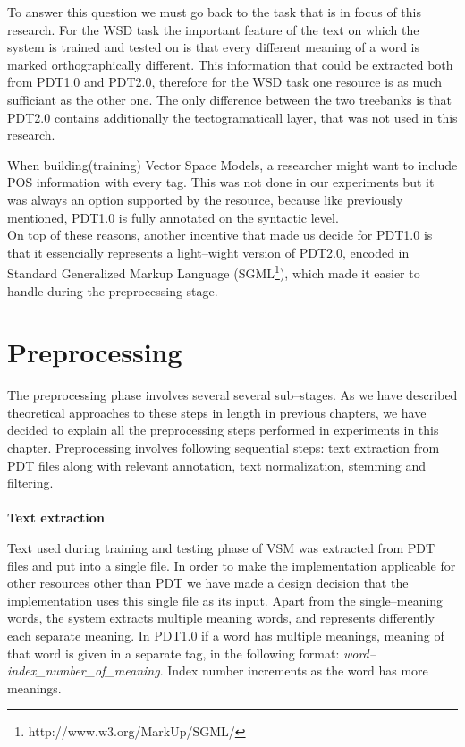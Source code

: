 To answer this question we must go back to the task that is in focus of this research. For the WSD task the 
important feature of the text on which the system is trained and tested on is that every different meaning of a 
word is marked orthographically different. This information that could be extracted both from PDT1.0 and 
PDT2.0, therefore for the WSD task one resource is as much sufficiant as the other one. The only 
difference between the two treebanks is that PDT2.0 contains additionally the tectogramaticall layer, that 
was not used in this research.  

When building(training) Vector Space Models, a researcher might want to include POS information with 
every tag. This was not done in our experiments but it was always an option supported by the resource, 
because like previously mentioned, PDT1.0 is fully annotated on the syntactic level. 
\\On top of these reasons, another incentive that made us decide for PDT1.0 is that it essencially 
represents a light--wight version of PDT2.0, encoded in Standard Generalized Markup Language 
(SGML\footnote{http://www.w3.org/MarkUp/SGML/}), which made it easier to handle during the 
preprocessing stage.

\section{Preprocessing}
The preprocessing phase involves several several sub--stages. As we have described theoretical approaches to these steps in length in previous chapters, we have decided to explain all the preprocessing steps performed in experiments in this chapter. Preprocessing involves following sequential steps: text extraction from PDT files along with relevant annotation, text normalization, stemming and filtering. 
\\\\  \textbf{Text extraction}

Text used during training and testing phase of VSM was extracted from PDT files and put into a single file. 
In order to make the implementation applicable for other resources other than PDT we have made a 
design decision that the implementation uses this single file as its input. Apart from the single--meaning 
words, the system extracts multiple meaning words, and represents differently each separate meaning. In 
PDT1.0 if a word has multiple meanings, meaning of that word is given in a separate tag, in the following format: 
\textit{word--index\_number\_of\_meaning}. Index number increments as the word has more meanings.

